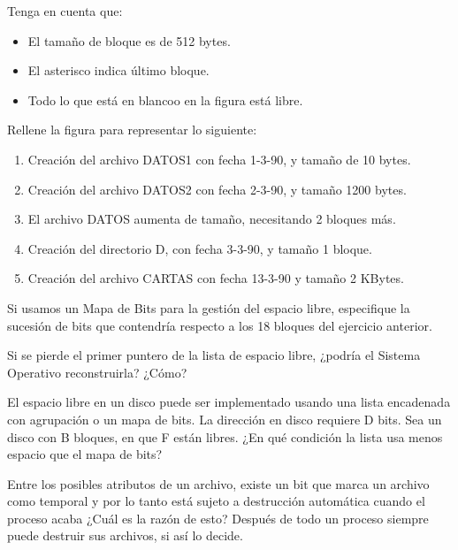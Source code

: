 \begin{ejercicio}
    Tenga en cuenta que:
    \begin{itemize}
        \item El tamaño de bloque es de 512 bytes.
        \item El asterisco indica último bloque.
        \item Todo lo que está en blancoo en la figura está libre.
    \end{itemize}

    Rellene la figura para representar lo siguiente:
    \begin{enumerate}
    \item Creación del archivo DATOS1 con fecha 1-3-90, y tamaño de 10 bytes.
    \item Creación del archivo DATOS2 con fecha 2-3-90, y tamaño 1200 bytes.
    \item El archivo DATOS aumenta de tamaño, necesitando 2 bloques más.
    \item Creación del directorio D, con fecha 3-3-90, y tamaño 1 bloque.
    \item Creación del archivo CARTAS con fecha 13-3-90 y tamaño 2 KBytes.
    \end{enumerate}
\end{ejercicio}

\begin{ejercicio}
Si usamos un Mapa de Bits para la gestión del espacio libre, especifique la sucesión de bits que contendría respecto a los 18 bloques del ejercicio anterior.
\end{ejercicio}

\begin{ejercicio}
Si se pierde el primer puntero de la lista de espacio libre, ¿podría el Sistema Operativo reconstruirla? ¿Cómo?
\end{ejercicio}

\begin{ejercicio}
El espacio libre en un disco puede ser implementado usando una lista encadenada con agrupación o un mapa de bits. La dirección en disco requiere D bits. Sea un disco con B bloques, en que F están libres. ¿En qué condición la lista usa menos espacio que el mapa de bits?
\end{ejercicio}

\begin{ejercicio}
Entre los posibles atributos de un archivo, existe un bit que marca un archivo como temporal y por lo tanto está sujeto a destrucción automática cuando el proceso acaba ¿Cuál es la razón de esto? Después de todo un proceso siempre puede destruir sus archivos, si así lo decide.
\end{ejercicio}

